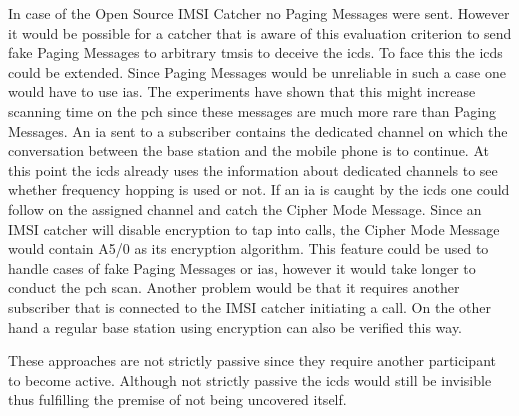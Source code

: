 In case of the Open Source IMSI Catcher no Paging Messages were sent.
However it would be possible for a catcher that is aware of this evaluation criterion to send fake Paging Messages to arbitrary \glspl{tmsi} to deceive the \gls{icds}.
To face this the \gls{icds} could be extended.
Since Paging Messages would be unreliable in such a case one would have to use \glspl{ia}.
The experiments have shown that this might increase scanning time on the \gls{pch} since these messages are much more rare than Paging Messages.
An \gls{ia} sent to a subscriber contains the dedicated channel on which the conversation between the base station and the mobile phone is to continue.
At this point the \gls{icds} already uses the information about dedicated channels to see whether frequency hopping is used or not.
If an \gls{ia} is caught by the \gls{icds} one could follow on the assigned channel and catch the Cipher Mode Message.
Since an IMSI catcher will disable encryption to tap into calls, the Cipher Mode Message would contain A5/0 as its encryption algorithm.
This feature could be used to handle cases of fake Paging Messages or \glspl{ia}, however it would take longer to conduct the \gls{pch} scan.
Another problem would be that it requires another subscriber that is connected to the IMSI catcher initiating a call.
On the other hand a regular base station using encryption can also be verified this way.

These approaches are not strictly passive since they require another participant to become active.
Although not strictly passive the \gls{icds} would still be invisible thus fulfilling the premise of not being uncovered itself.

